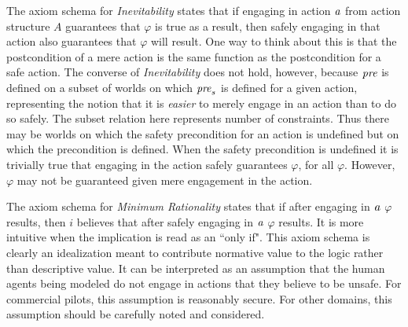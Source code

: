 The axiom schema for \emph{Inevitability} states that if engaging in action $\mathit{a}$ from action structure $A$ guarantees that $\varphi$ is true as a result, then safely engaging in that action also guarantees that $\varphi$ will result. One way to think about this is that the postcondition of a mere action is the same function as the postcondition for a safe action. The converse of \emph{Inevitability} does not hold, however, because $\mathit{pre}$ is defined on a subset of worlds on which $\mathit{pre}_s$ is defined for a given action, representing the notion that it is \emph{easier} to merely engage in an action than to do so safely. The subset relation here represents number of constraints. Thus there may be worlds on which the safety precondition for an action is undefined but on which the precondition is defined. When the safety precondition is undefined it is trivially true that engaging in the action safely guarantees $\varphi$, for all $\varphi$. However, $\varphi$ may not be guaranteed given mere engagement in the action.

The axiom schema for \emph{Minimum Rationality} states that if after engaging in $\mathit{a}$ $\varphi$ results, then $i$ believes that after safely engaging in $\mathit{a}$ $\varphi$ results. It is more intuitive when the implication is read as an ``only if". This axiom schema is clearly an idealization meant to contribute normative value to the logic rather than descriptive value. It can be interpreted as an assumption that the human agents being modeled do not engage in actions that they believe to be unsafe. For commercial pilots, this assumption is reasonably secure. For other domains, this assumption should be carefully noted and considered.